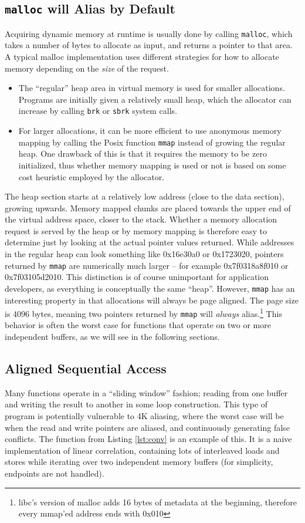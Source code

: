 \documentclass[a4paper,10pt,twocolumn,twoside]{article}
\begin{document}
{\subsection{\texttt{malloc} will Alias by Default}
Acquiring dynamic memory at runtime is usually done by calling \texttt{malloc}, which takes a number of bytes to allocate as input, and returns a pointer to that area.
A typical malloc implementation uses different strategies for how to allocate memory depending on the \emph{size} of the request.
\begin{itemize}
  \item The ``regular'' heap area in virtual memory is used for smaller allocations. 
  Programs are initially given a relatively small heap, which the allocator can increase by calling \texttt{brk} or \texttt{sbrk} system calls.

  \item For larger allocations, it can be more efficient to use anonymous memory mapping by calling the Posix function \texttt{mmap} instead of growing the regular heap.
  One drawback of this is that it requires the memory to be zero initialized, thus whether memory mapping is used or not is based on some cost heuristic employed by the allocator.
\end{itemize}
The heap section starts at a relatively low address (close to the data section), growing upwards.
Memory mapped chunks are placed towards the upper end of the virtual address space, closer to the stack.
Whether a memory allocation request is served by the heap or by memory mapping is therefore easy to determine just by looking at the actual pointer values returned.
While addresses in the regular heap can look something like 0x16e30a0 or 0x1723020, pointers returned by \texttt{mmap} are numerically much larger -- for example 0x7f0318a8f010 or 0x7f03105d2010.
This distinction is of course unimportant for application developers, as everything is conceptually the same ``heap''.
However, \texttt{mmap} has an interesting property in that allocations will always be page aligned.
The page size is 4096 bytes, meaning two pointers returned by \texttt{mmap} will \emph{always} alias.\footnote{libc's version of malloc adds 16 bytes of metadata at the beginning, therefore every mmap'ed address ends with 0x010}
This behavior is often the worst case for functions that operate on two or more independent buffers, as we will see in the following sections.


\subsection{Aligned Sequential Access}
Many functions operate in a ``sliding window'' fashion; reading from one buffer and writing the result to another in some loop construction.
This type of program is potentially vulnerable to 4K aliasing, where the worst case will be when the read and write pointers are aliased, and continuously generating false conflicts.
The function from Listing \ref{lst:conv} is an example of this.
It is a naive implementation of linear correlation, containing lots of interleaved loads and stores while iterating over two independent memory buffers (for simplicity, endpoints are not handled).

}
\end{document}

